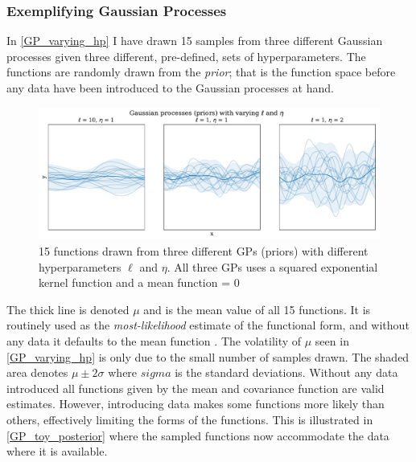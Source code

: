 \documentclass[a4paper]{article}
\begin{document}
\subsubsection{Exemplifying Gaussian Processes}

In \autoref{GP_varying_hp} I have drawn 15 samples from three different Gaussian processes given three different, pre-defined, sets of hyperparameters. The functions are randomly drawn from the \emph{prior}; that is the function space before any data have been introduced to the Gaussian processes at hand.\par

\begin{figure}[!htb]
	\centering
	\includegraphics[scale=0.47]{GP_varying_hp.pdf}
    \caption{\footnotesize{15 functions drawn from three different GPs (priors) with different hyperparameters $\ell$ and $\eta$. All three GPs uses a squared exponential kernel function and a mean function = 0}}\label{GP_varying_hp}
\end{figure}

The thick line is denoted $\mu$ and is the mean value of all 15 functions. It is routinely used as the \emph{most-likelihood} estimate of the functional form, and without any data it defaults to the mean function \cite[3]{williams2006gaussian}. The volatility of $\mu$ seen in \autoref{GP_varying_hp} is only due to the small number of samples drawn. The shaded area denotes $\mu \pm 2\sigma$ where $sigma$ is the standard deviations. Without any data introduced all functions given by the mean and covariance function are valid estimates. However, introducing data makes some functions more likely than others, effectively limiting the forms of the functions. This is illustrated in \autoref{GP_toy_posterior} where the sampled functions now accommodate the data where it is available.\par  
\end{document}
